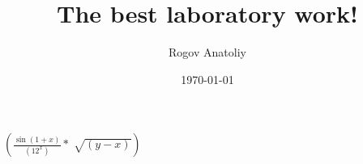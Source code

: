 \documentclass[12pt, letterpaper]{article}
\title{The best laboratory work!}
\author{Rogov Anatoliy}
\date{\today}
\begin{document}
\maketitle
\newpage
$(\frac{\sin{(1+x)}}{(12^x)}*\sqrt[]{(y-x)})$
\end{document}
